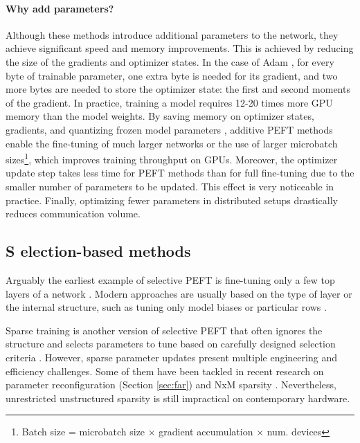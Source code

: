 \paragraph{Why add parameters?} Although these methods introduce additional parameters to the network, they achieve significant speed and memory improvements. This is achieved by reducing the size of the gradients and optimizer states. In the case of Adam \citep{adam}, for every byte of trainable parameter, one extra byte is needed for its gradient, and two more bytes are needed to store the optimizer state: the first and second moments of the gradient. In practice, training a model requires 12-20 times more GPU memory than the model weights. By saving memory on optimizer states, gradients, and quantizing frozen model parameters \citep{dettmers2023qlora}, additive PEFT methods enable the fine-tuning of much larger networks or the use of larger microbatch sizes\footnote{Batch size = microbatch size $\times$ gradient accumulation $\times$ num. devices}, which improves training throughput on GPUs. Moreover, the optimizer update step takes less time for PEFT methods than for full fine-tuning due to the smaller number of parameters to be updated. This effect is very noticeable in practice. Finally, optimizing fewer parameters in distributed setups drastically reduces communication volume.


\subsection{\textcolor{s_color}{S} election-based methods}

Arguably the earliest example of selective PEFT is fine-tuning only a few top layers of a network \citep{last_layer_tuning}. Modern approaches are usually based on the type of layer \citep{cross_attention_tuning,layer_norm_tuning} or the internal structure, such as tuning only model biases \citep{bitfit} or particular rows \citep{far_edge}.

Sparse training is another version of selective PEFT that often ignores the structure and selects parameters to tune based on carefully designed selection criteria \citep{fish_mask,lottery_ticket_tuning,diff_pruning}. However, sparse parameter updates present multiple engineering and efficiency challenges. Some of them have been tackled in recent research on parameter reconfiguration \citep{far_edge} (Section \ref{sec:far}) and NxM sparsity \citep{nxm_transformer}. Nevertheless, unrestricted unstructured sparsity is still impractical on contemporary hardware.

